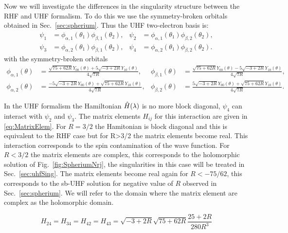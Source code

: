 \documentclass[11pt,a4paper]{article}
\newcommand{\hH}{\Hat{H}}
\begin{document}
Now we will investigate the differences in the singularity structure between the RHF and UHF formalism. To do this we use the symmetry-broken orbitals obtained in Sec.~\ref{sec:spherium}. Thus the UHF two-electron basis is:
\begin{align}\label{eq:uhfbasis}
 \psi_1 & =\phi_{\alpha,1}(\theta_1)\phi_{\beta,1}(\theta_2),
 & 
 \psi_2 & =\phi_{\alpha,1}(\theta_1)\phi_{\beta,2}(\theta_2),\\
 \psi_3 & =\phi_{\alpha,2}(\theta_1)\phi_{\beta,1}(\theta_2),
 & 
 \psi_4 & =\phi_{\alpha,2}(\theta_1)\phi_{\beta,2}(\theta_2).
\end{align}
with the symmetry-broken orbitals
\begin{align*}\label{eq:uhforbitals}
 \phi_{\alpha,1}(\theta) & =\frac{\sqrt{75+62R}Y_{00}(\theta)+5\sqrt{-3+2R}Y_{10}(\theta)}{4\sqrt{7R}},
 & 
 \phi_{\beta,1}(\theta) & =\frac{\sqrt{75+62R}Y_{00}(\theta)-5\sqrt{-3+2R}Y_{10}(\theta)}{4\sqrt{7R}},\\
 \phi_{\alpha,2}(\theta) & =\frac{-5\sqrt{-3+2R}Y_{00}(\theta)+\sqrt{75+62R}Y_{10}(\theta)}{4\sqrt{7R}},
 & 
 \phi_{\beta,2}(\theta) & =\frac{5\sqrt{-3+2R}Y_{00}(\theta)+\sqrt{75+62R}Y_{10}(\theta)}{4\sqrt{7R}}.
\end{align*}

In the UHF formalism the Hamiltonian $\hH(\lambda)$ is no more block diagonal, $\psi_4$ can interact with $\psi_2$ and $\psi_3$. The matrix elements $H_{ij}$ for this interaction are given in \eqref{eq:MatrixElem}. For $R=3/2$ the Hamitonian is block diagonal and this is equivalent to the RHF case but for R>3/2 the matrix elements become real. This interaction corresponds to the spin contamination of the wave function. For $R<3/2$ the matrix elements are complex, this corresponds to the holomorphic solution of Fig.~\ref{fig:SpheriumNrj}, the singularities in this case will be treated in Sec.~\ref{sec:uhfSing}. The matrix elements become real again for $R<-75/62$, this corresponds to the sb-UHF solution for negative value of $R$ observed in Sec.~\ref{sec:spherium}. We will refer to the domain where the matrix element are complex as the holomorphic domain.

\begin{equation}\label{eq:MatrixElem}
H_{24}=H_{34}=H_{42}=H_{43}=\sqrt{-3+2R}\sqrt{75+62R}\frac{25+2R}{280R^3}
\end{equation}
\end{document}
